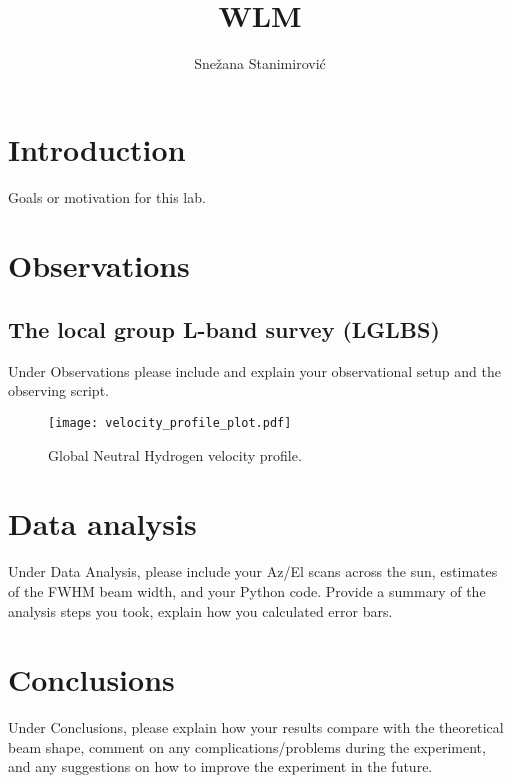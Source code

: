 \documentclass[linenumbers,twocolumn]{aastex631}
\begin{document}
\title{WLM}



\author[0000-0002-3418-7817]{Sne\v zana Stanimirovi\'c}





\section{Introduction}

Goals or motivation for this lab.



\section{Observations} \label{sec:observations}
\subsection{The local group L-band survey (LGLBS)}

Under Observations please include and explain your observational setup and the observing script. 


\begin{figure}
    \centering
    \texttt{[image: velocity\_profile\_plot.pdf]}
    \caption{Global Neutral Hydrogen velocity profile.}
    \label{fig:velocity_profile}
\end{figure}


\section{Data analysis} 
\label{sec:results}

Under Data Analysis, please include your Az/El scans across the sun, estimates of the FWHM beam width, and your Python code. Provide a summary of the analysis steps you took, explain how you calculated error bars.


\section{Conclusions}

Under Conclusions, please explain how your results compare with the theoretical beam shape, comment on any complications/problems during the experiment, and any suggestions on how to improve the experiment in the future.


{}

\end{document}
